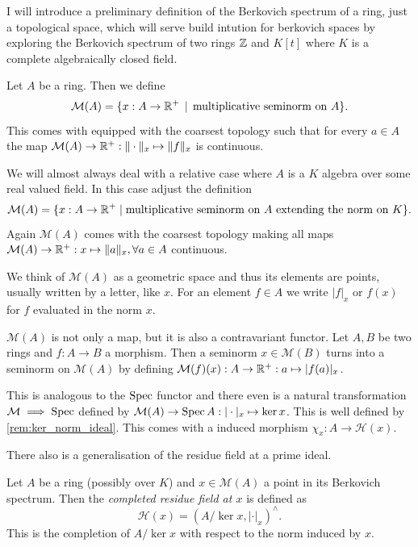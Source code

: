 

I will introduce a preliminary definition of the Berkovich spectrum of a ring, just a topological space, which will serve build intution for berkovich spaces by exploring the Berkovich spectrum of two rings $\mathbb{Z}$ and $K[t]$ where $K$ is a complete algebraically closed field. 

\begin{definition}
	Let $A$ be a ring. Then we define \[
		\mathcal{M} (A) = \{x: A \to \R^{+} \st \text{multiplicative seminorm on } A\} 
	.\] 
	This comes with equipped with the coarsest topology such that for every $a \in A$ the map $\mathcal{M} (A) \to \mathbb{R}^{+}: \|\cdot \|_x \mapsto \|f\|_x $ is continuous. 

	We will almost always deal with a relative case where $A$ is a $K$ algebra over some real valued field. In this case adjust the definition \[
		\mathcal{M} (A) = \{x : A \to \mathbb{R}^{ + }  \mid \text{multiplicative seminorm on }A \text{ extending the norm on } K\} 
	.\] 
	Again $\mathcal{M} (A)$ comes with the coarsest topology making all maps $\mathcal{M} (A) \to \mathbb{R}^{+}: x \mapsto \|a\|_x, \forall a \in A$ continuous. 
\end{definition}
We think of $\mathcal{M} (A)$ as a geometric space and thus its elements are points, usually written by a letter, like $x$. 
For an element $f \in A$ we write $|f|_x$ or $f(x)$ for  $f$ evaluated in the norm $x$. 

\begin{remark}
	$\mathcal{M} (A)$ is not only a map, but it is also a contravariant functor. 
	Let $A, B$ be two rings and $f: A \to B$ a morphism. 
	Then a seminorm $x \in \mathcal{M} (B)$ turns into a seminorm on $\mathcal{M} (A)$ by defining $\mathcal{M} (f)(x): A \to \mathbb{R}^{ +}: a \mapsto |f(a)|_x$.


This is analogous to the $\operatorname{Spec}$ functor and there even is a natural transformation $\mathcal{M} \implies \operatorname{Spec}$ defined by $\mathcal{M} (A) \to \operatorname{Spec} A: |\cdot |_x \mapsto \ker x$. This is well defined by \cref{rem:ker_norm_ideal}. 
This comes with a induced morphism $\chi_x: A \to \mathcal{H} (x)$.
\end{remark}

There also is a generalisation of the residue field at a prime ideal. 

\begin{definition}\label{def:completed_residue_field}
	Let $A$ be a ring (possibly over $K$) and $x \in \mathcal{M} (A)$ a point in its Berkovich spectrum. 
	Then the \emph{completed residue field at $x$} is defined as \[
		\mathcal{H} (x) = (A / \ker x, |\cdot |_x)^{\wedge}
	.\] 
	This is the completion of $A / \ker x$ with respect to the norm induced by $x$. 
\end{definition}

